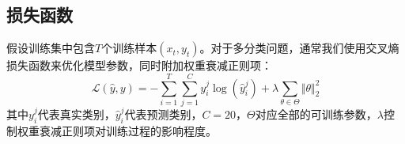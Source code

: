 \subsection{损失函数}

假设训练集中包含$T$个训练样本$(x_t,y_t)$。对于多分类问题，通常我们使用交叉熵损失函数来优化模型参数，同时附加权重衰减正则项：
\begin{equation}
    \mathcal{L}(\hat{y},y)=-\sum_{i=1}^T\sum_{j=1}^Cy_i^j\log(\hat{y}_i^j)+\lambda\sum_{\theta\in\Theta}\Vert\theta\Vert_2^2
\end{equation}
其中$y_i^j$代表真实类别，$\hat{y}_i^j$代表预测类别，$C=20$，$\Theta$对应全部的可训练参数，$\lambda$控制权重衰减正则项对训练过程的影响程度。
